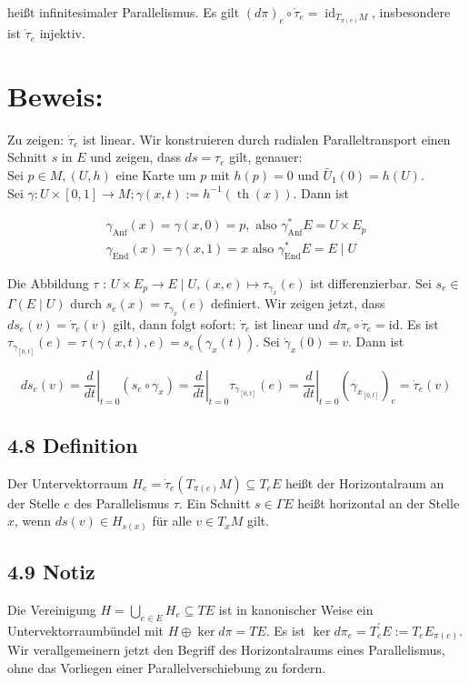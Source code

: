 \documentclass[10pt, letterpaper]{article}
\begin{document}
heißt infinitesimaler Parallelismus. Es gilt $(d \pi)_{e} \circ \dot{\tau}_{e}=\operatorname{id}_{T_{\pi(e)} M}$, insbesondere ist $\dot{\tau}_{e}$ injektiv.

\section*{Beweis:}
Zu zeigen: $\dot{\tau}_{e}$ ist linear. Wir konstruieren durch radialen Paralleltransport einen Schnitt $s$ in $E$ und zeigen, dass $d s=\tau_{e}$ gilt, genauer:\\
Sei $p \in M,(U, h)$ eine Karte um $p$ mit $h(p)=0$ und $\bar{U}_{1}(0)=h(U)$.\\
Sei $\gamma: U \times[0,1] \rightarrow M ; \gamma(x, t):=h^{-1}(\operatorname{th}(x))$. Dann ist

$$
\begin{gathered}
\gamma_{\mathrm{Anf}}(x)=\gamma(x, 0)=p, \text { also } \gamma_{\mathrm{Anf}}^{*} E=U \times E_{p} \\
\gamma_{\mathrm{End}}(x)=\gamma(x, 1)=x \text { also } \gamma_{\mathrm{End}}^{*} E=E \mid U
\end{gathered}
$$

Die Abbildung $\tau$ : $U \times E_{p} \rightarrow E \mid U,(x, e) \mapsto \tau_{\gamma_{x}}(e)$ ist differenzierbar. Sei $s_{e} \in$ $\Gamma(E \mid U)$ durch $s_{e}(x)=\tau_{\gamma_{x}}(e)$ definiert. Wir zeigen jetzt, dass $d s_{e}(v)=\dot{\tau}_{e}(v)$ gilt, dann folgt sofort: $\dot{\tau}_{e}$ ist linear und $d \pi_{e} \circ \dot{\tau}_{e}=\mathrm{id}$. Es ist $\tau_{\gamma_{[0, t]}}(e)=\tau(\gamma(x, t), e)=s_{e}\left(\gamma_{x}(t)\right)$. Sei $\dot{\gamma}_{x}(0)=v$. Dann ist

$$
d s_{e}(v)=\left.\frac{d}{d t}\right|_{t=0}\left(s_{e} \circ \gamma_{x}\right)=\left.\frac{d}{d t}\right|_{t=0} \tau_{\gamma_{[0, t]}}(e)=\left.\frac{d}{d t}\right|_{t=0}\left(\gamma_{x_{[0, t]}}\right)_{e}=\dot{\tau}_{e}(v)
$$

\subsection*{4.8 Definition}
Der Untervektorraum $H_{e}=\dot{\tau}_{e}\left(T_{\pi(e)} M\right) \subseteq T_{e} E$ heißt der Horizontalraum an der Stelle $e$ des Parallelismus $\tau$. Ein Schnitt $s \in \Gamma E$ heißt horizontal an der Stelle $x$, wenn $d s(v) \in H_{s(x)}$ für alle $v \in T_{x} M$ gilt.

\subsection*{4.9 Notiz}
Die Vereinigung $H=\bigcup_{e \in E} H_{e} \subseteq T E$ ist in kanonischer Weise ein Untervektorraumbündel mit $H \oplus \operatorname{ker} d \pi=T E$. Es ist $\operatorname{ker} d \pi_{e}=T_{e}^{\prime} E:=T_{e} E_{\pi(e)}$.\\
Wir verallgemeinern jetzt den Begriff des Horizontalraums eines Parallelismus, ohne das Vorliegen einer Parallelverschiebung zu fordern.
\end{document}
